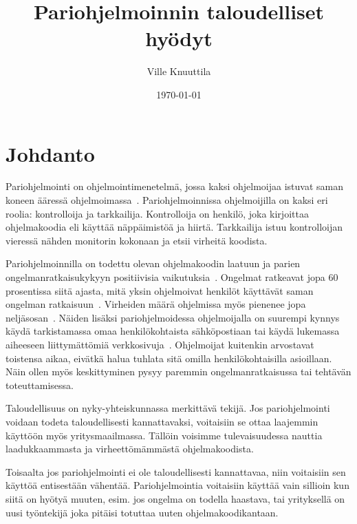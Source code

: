\documentclass[finnish]{tktltiki2}
\title{Pariohjelmoinnin taloudelliset hyödyt}
\author{Ville Knuuttila}
\date{\today}
\theoremstyle{definition}
\theoremstyle{remark}
\begin{document}

\maketitle        %
\makeabstract     %

\tableofcontents  %
\newpage          %



\section{Johdanto}

Pariohjelmointi on ohjelmointimenetelmä, jossa kaksi ohjelmoijaa istuvat saman koneen ääressä ohjelmoimassa~\cite{pairprogramming2}. Pariohjelmoinnissa ohjelmoijilla on kaksi eri roolia: kontrolloija ja tarkkailija. Kontrolloija on henkilö, joka kirjoittaa ohjelmakoodia eli käyttää näppäimistöä ja hiirtä. Tarkkailija istuu kontrolloijan vieressä nähden monitorin kokonaan ja etsii virheitä koodista. 

Pariohjelmoinnilla on todettu olevan ohjelmakoodin laatuun ja parien ongelmanratkaisukykyyn positiivisia vaikutuksia~\cite{pairprogramming}. Ongelmat ratkeavat jopa 60 prosentissa siitä ajasta, mitä yksin ohjelmoivat henkilöt käyttävät saman ongelman ratkaisuun~\cite{meta}. Virheiden määrä ohjelmissa myös pienenee jopa neljäsosan~\cite{williams00str}. Näiden lisäksi pariohjelmoidessa ohjelmoijalla on suurempi kynnys käydä tarkistamassa omaa henkilökohtaista sähköpostiaan tai käydä lukemassa aiheeseen liittymättömiä verkkosivuja~\cite{williams03pair}. Ohjelmoijat kuitenkin arvostavat toistensa aikaa, eivätkä halua tuhlata sitä omilla henkilökohtaisilla asioillaan. Näin ollen myös keskittyminen pysyy paremmin ongelmanratkaisussa tai tehtävän toteuttamisessa.

Taloudellisuus on nyky-yhteiskunnassa merkittävä tekijä. Jos pariohjelmointi voidaan todeta taloudellisesti kannattavaksi, voitaisiin se ottaa laajemmin käyttöön myös yritysmaailmassa. Tällöin voisimme tulevaisuudessa nauttia laadukkaammasta ja virheettömämmästä ohjelmakoodista.

Toisaalta jos pariohjelmointi ei ole taloudellisesti kannattavaa, niin voitaisiin sen käyttöä entisestään vähentää. Pariohjelmointia voitaisiin käyttää vain sillioin kun siitä on hyötyä muuten, esim. jos ongelma on todella haastava, tai yrityksellä on uusi työntekijä joka pitäisi totuttaa uuten ohjelmakoodikantaan.
\end{document}
